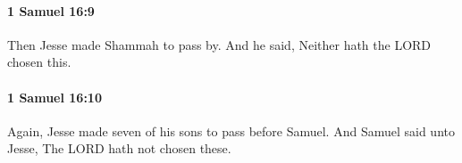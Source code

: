 		\paragraph{1 Samuel 16:9} %
			\label{1SAMUEL-16-9}

			Then Jesse made Shammah to pass by. And he said, Neither hath the LORD chosen this.


		\paragraph{1 Samuel 16:10} %
			\label{1SAMUEL-16-10}

			Again, Jesse made seven of his sons to pass before Samuel. And Samuel said unto Jesse, The LORD hath not chosen these.


